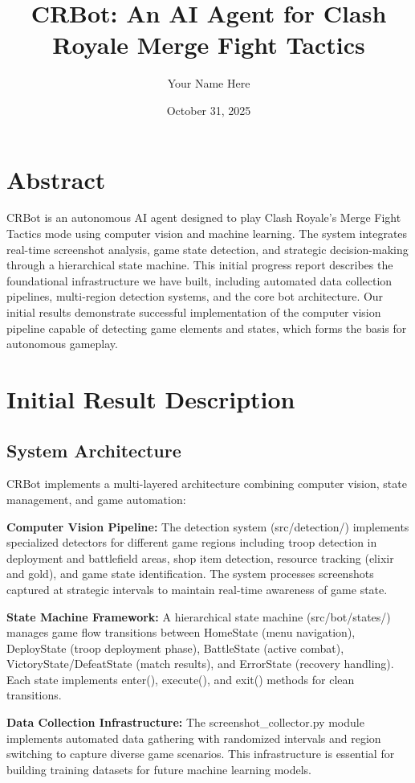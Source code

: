 \documentclass[12pt]{article}
\title{\textbf{CRBot: An AI Agent for Clash Royale Merge Fight Tactics}}
\author{Your Name Here} %
\date{October 31, 2025}
\begin{document}
\maketitle

\section*{Abstract}
CRBot is an autonomous AI agent designed to play Clash Royale's Merge Fight Tactics mode using computer vision and machine learning. The system integrates real-time screenshot analysis, game state detection, and strategic decision-making through a hierarchical state machine. This initial progress report describes the foundational infrastructure we have built, including automated data collection pipelines, multi-region detection systems, and the core bot architecture. Our initial results demonstrate successful implementation of the computer vision pipeline capable of detecting game elements and states, which forms the basis for autonomous gameplay.

\section*{Initial Result Description}

\subsection*{System Architecture}
CRBot implements a multi-layered architecture combining computer vision, state management, and game automation:

\textbf{Computer Vision Pipeline:} The detection system (src/detection/) implements specialized detectors for different game regions including troop detection in deployment and battlefield areas, shop item detection, resource tracking (elixir and gold), and game state identification. The system processes screenshots captured at strategic intervals to maintain real-time awareness of game state.

\textbf{State Machine Framework:} A hierarchical state machine (src/bot/states/) manages game flow transitions between HomeState (menu navigation), DeployState (troop deployment phase), BattleState (active combat), VictoryState/DefeatState (match results), and ErrorState (recovery handling). Each state implements enter(), execute(), and exit() methods for clean transitions.

\textbf{Data Collection Infrastructure:} The screenshot\_collector.py module implements automated data gathering with randomized intervals and region switching to capture diverse game scenarios. This infrastructure is essential for building training datasets for future machine learning models.
\end{document}
